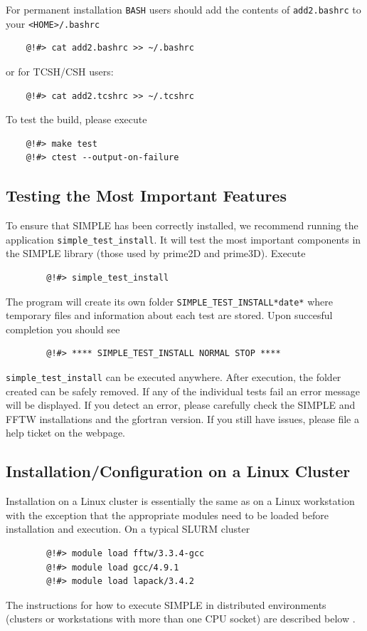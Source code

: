 \documentclass[a4paper,11pt]{article}
\begin{document}
\noindent{}For permanent installation \texttt{BASH} users should add the contents of \texttt{add2.bashrc} to your \texttt{<HOME>/.bashrc}
\begin{verbatim}
    @!#> cat add2.bashrc >> ~/.bashrc
\end{verbatim}
\noindent{}or for TCSH/CSH users:
\begin{verbatim}
    @!#> cat add2.tcshrc >> ~/.tcshrc
\end{verbatim}
\noindent{}To test the build, please execute
\begin{verbatim}
    @!#> make test
    @!#> ctest --output-on-failure
\end{verbatim}

\subsection{Testing the Most Important Features}

\noindent{}To ensure that SIMPLE has been correctly installed, we recommend running the application \texttt{simple\_test\_install}. It will test the most 
important components in the SIMPLE library  (those used by prime2D and  prime3D). Execute

\begin{verbatim}
        @!#> simple_test_install 
\end{verbatim}

\noindent{}The program will create its own folder \texttt{SIMPLE\_TEST\_INSTALL*date*} where temporary files and information about each 
test are stored. Upon succesful completion you should see

\begin{verbatim}
        @!#> **** SIMPLE_TEST_INSTALL NORMAL STOP ****
\end{verbatim}

\noindent{}\texttt{simple\_test\_install} can be executed anywhere. After execution, the folder created can be safely removed. If any of the individual 
tests fail an error message will be displayed. If you detect an error, please carefully check the SIMPLE and FFTW installations 
and the gfortran version. If you still have issues, please file a help ticket on the webpage.

\subsection{Installation/Configuration on a Linux Cluster}

Installation on a Linux cluster is essentially the same as on a Linux workstation with the exception that the appropriate modules need to be loaded before installation and execution. On a typical SLURM cluster
\begin{verbatim}
        @!#> module load fftw/3.3.4-gcc
        @!#> module load gcc/4.9.1
        @!#> module load lapack/3.4.2 
\end{verbatim}
The instructions for how to execute SIMPLE in distributed environments (clusters or workstations with more than one CPU socket) are described below \label{distr}.
\end{document}

